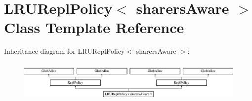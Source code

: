 \hypertarget{classLRUReplPolicy}{\section{L\-R\-U\-Repl\-Policy$<$ sharers\-Aware $>$ Class Template Reference}
\label{classLRUReplPolicy}
}
Inheritance diagram for L\-R\-U\-Repl\-Policy$<$ sharers\-Aware $>$\-:\begin{figure}[H]
\begin{center}
\leavevmode
\includegraphics[height=2.028986cm]{classLRUReplPolicy}
\end{center}
\end{figure}
